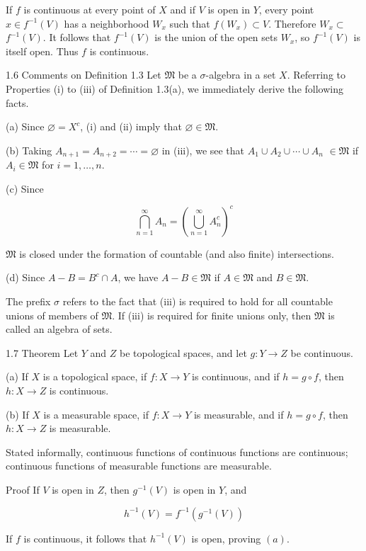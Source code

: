 \documentclass[10pt]{article}
\begin{document}
If $f$ is continuous at every point of $X$ and if $V$ is open in $Y$, every point $x \in f^{-1}(V)$ has a neighborhood $W_{x}$ such that $f\left(W_{x}\right) \subset V$. Therefore $W_{x} \subset$ $f^{-1}(V)$. It follows that $f^{-1}(V)$ is the union of the open sets $W_{x}$, so $f^{-1}(V)$ is itself open. Thus $f$ is continuous.

1.6 Comments on Definition 1.3 Let $\mathfrak{M}$ be a $\sigma$-algebra in a set $X$. Referring to Properties (i) to (iii) of Definition 1.3(a), we immediately derive the following facts.

(a) Since $\varnothing=X^{c}$, (i) and (ii) imply that $\varnothing \in \mathfrak{M}$.

(b) Taking $A_{n+1}=A_{n+2}=\cdots=\varnothing$ in (iii), we see that $A_{1} \cup A_{2} \cup \cdots \cup A_{n}$ $\in \mathfrak{M}$ if $A_{i} \in \mathfrak{M}$ for $i=1, \ldots, n$.

(c) Since

$$
\bigcap_{n=1}^{\infty} A_{n}=\left(\bigcup_{n=1}^{\infty} A_{n}^{c}\right)^{c}
$$

$\mathfrak{M}$ is closed under the formation of countable (and also finite) intersections.

(d) Since $A-B=B^{c} \cap A$, we have $A-B \in \mathfrak{M}$ if $A \in \mathfrak{M}$ and $B \in \mathfrak{M}$.

The prefix $\sigma$ refers to the fact that (iii) is required to hold for all countable unions of members of $\mathfrak{M}$. If (iii) is required for finite unions only, then $\mathfrak{M}$ is called an algebra of sets.

1.7 Theorem Let $Y$ and $Z$ be topological spaces, and let $g: Y \rightarrow Z$ be continuous.

(a) If $X$ is a topological space, if $f: X \rightarrow Y$ is continuous, and if $h=g \circ f$, then $h: X \rightarrow Z$ is continuous.

(b) If $X$ is a measurable space, if $f: X \rightarrow Y$ is measurable, and if $h=g \circ f$, then $h: X \rightarrow Z$ is measurable.

Stated informally, continuous functions of continuous functions are continuous; continuous functions of measurable functions are measurable.

Proof If $V$ is open in $Z$, then $g^{-1}(V)$ is open in $Y$, and

$$
h^{-1}(V)=f^{-1}\left(g^{-1}(V)\right)
$$

If $f$ is continuous, it follows that $h^{-1}(V)$ is open, proving $(a)$.
\end{document}

